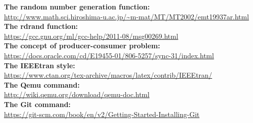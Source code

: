 \documentclass[10pt,draftclsnofoot,peerreview,letterpaper,onecolumn,]{IEEEtran}
\begin{document}
\begin{thebibliography}{1}

\textbf{The random number generation function:}\\ \color{blue}\url{http://www.math.sci.hiroshima-u.ac.jp/~m-mat/MT/MT2002/emt19937ar.html}\\
\color{black}
\textbf{The rdrand function:}\\ 
\color{blue}\url{https://gcc.gnu.org/ml/gcc-help/2011-08/msg00269.html}\\
\color{black}
\textbf{The concept of producer-consumer problem:}\\
\color{blue}\url{https://docs.oracle.com/cd/E19455-01/806-5257/sync-31/index.html}
\\
\color{black}
\textbf{The IEEEtran style:}\\
\color{blue}\url{https://www.ctan.org/tex-archive/macros/latex/contrib/IEEEtran/}
\\
\color{black}
\textbf{The Qemu command:}\\
\color{blue}\url{http://wiki.qemu.org/download/qemu-doc.html}
\\
\color{black}
\textbf{The Git command:}\\
\color{blue}\url{https://git-scm.com/book/en/v2/Getting-Started-Installing-Git}

\end{thebibliography}
\end{document}

